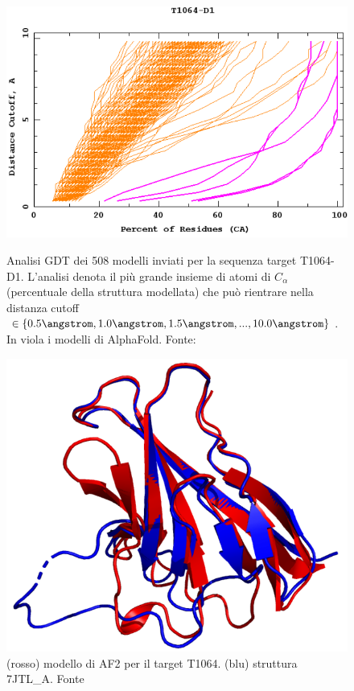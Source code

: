\begin{figure}[!htb]
	\centering
	\includegraphics[scale=0.3]{images/t1064-af2.png}
	\caption{Analisi GDT dei 508 modelli inviati per la sequenza target T1064-D1. L'analisi denota il più grande insieme di atomi di $C_{\alpha}$ (percentuale della struttura modellata) che può rientrare nella distanza cutoff $ \in \{ 0.5 \angstrom, 1.0 \angstrom, 1.5 \angstrom, ... , 10.0 \angstrom \} $. In viola i modelli di AlphaFold. Fonte: \cite{CaspRes}}
	\label{fig:t1064-chart}
	\endminipage\hfill
	\centering
	\includegraphics[scale=0.3]{images/t1064_model.png}
	\caption{(rosso) modello di AF2 per il target T1064. (blu) struttura 7JTL\_A. Fonte \cite{blopigAF}}
	\label{fig:t1064-afmodel}
	\endminipage\hfill
\end{figure}

